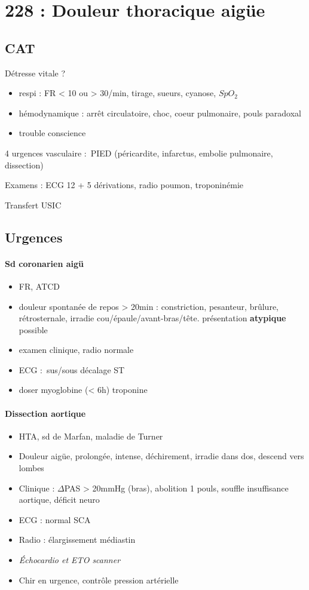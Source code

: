 \section{228 : Douleur thoracique aigüe}%
\label{sec:228_douleur_thoracique_aigue}

\subsection{CAT}
Détresse vitale ?
\begin{itemize}
  \item respi : FR < 10 ou > 30/min, tirage, sueurs, cyanose, $SpO_2$
  \item hémodynamique : arrêt circulatoire, choc, coeur pulmonaire, pouls
    paradoxal
  \item trouble conscience
\end{itemize}

4 urgences vasculaire : PIED (péricardite, infarctus, embolie pulmonaire,
dissection)

Examens : ECG 12 + 5 dérivations, radio poumon, troponinémie

Transfert USIC

\subsection{Urgences}

\paragraph{Sd coronarien aigü}
\begin{itemize}
  \item FR, ATCD
  \item douleur spontanée de repos > 20min : constriction, pesanteur, brûlure,
    rétrosternale, irradie  cou/épaule/avant-bras/tête. \danger présentation
    \textbf{atypique} possible
  \item examen clinique, radio normale
  \item ECG : sus/sous décalage ST
  \item doser myoglobine (< 6h) \lor{} troponine
\end{itemize}

\paragraph{Dissection aortique}
\begin{itemize}
  \item HTA, sd de Marfan, maladie de Turner
  \item Douleur aigüe, prolongée, intense, déchirement, irradie dans dos, descend
    vers lombes
  \item Clinique : $\Delta$PAS > 20mmHg (bras), abolition 1 pouls, souffle
    insuffisance aortique, déficit neuro
  \item ECG : normal \lor{} SCA
  \item Radio : élargissement médiastin
  \item \textit{Échocardio et ETO \lor{} scanner} 
  \item Chir en urgence, contrôle pression artérielle
\end{itemize}

